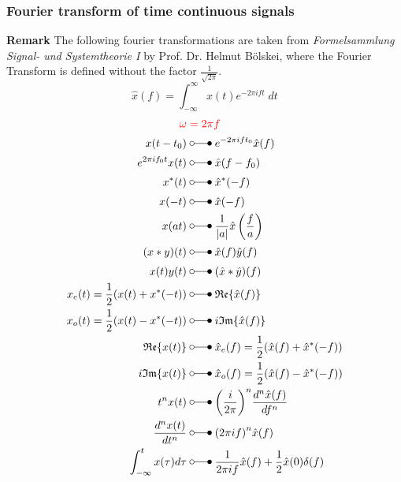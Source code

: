 \subsubsection{Fourier transform of time continuous signals}
{\footnotesize \textbf{Remark} The following fourier transformations are taken from \textit{Formelsammlung Signal- und Systemtheorie I} by Prof. Dr. Helmut Bölskei, 
where the Fourier Transform is defined without the factor $\frac{1}{\sqrt{2\pi}}$.}
\begin{equation*}
    \widehat{x}(f) =\int_{-\infty}^{\infty} x(t) e^{-2\pi ift}\; dt
\end{equation*}
\begin{align*}
    {\color{red} \omega}\;                   & {\color{red} =2\pi f}                                                    \\
    x(t-t_{0})  \;                           & \laplace\;    e^{-2\pi ift_{0}}\hat{x}(f)                                \\
    e^{2\pi if_0t}x(t)  \;                   & \laplace\;    \hat{x}(f-f_0)                                             \\
    x^{*}(t)  \;                             & \laplace\;    \hat{x}^{*}(-f)                                            \\
    x(-t)  \;                                & \laplace\;    \hat{x}(-f)                                                \\
    x(at)  \;                                & \laplace\;    \frac{1}{|a|}\hat{x}\left(\frac fa\right)                  \\
    (x*y)(t)  \;                             & \laplace\;    \hat{x}(f)\hat{y}(f)                                       \\
    x(t)y(t) \;                              & \laplace\;    (\hat{x}*\hat{y})(f)                                       \\
    x_{e}(t)=\frac{1}{2}(x(t)+x^{*}(-t))  \; & \laplace\;    \mathfrak{Re}\{\hat{x}(f)\}                                \\
    x_o(t)=\frac{1}{2}(x(t)-x^*(-t)) \;      & \laplace\;    i\mathfrak{Im}\{\hat{x}(f)\}                               \\
    \mathfrak{Re}\{x(t)\}  \;                & \laplace\;    \hat{x}_{e}(f) =\frac{1}{2}(\hat{x}(f)+\hat{x}^{*}(-f))    \\
    i\mathfrak{Im}\{x(t)\}  \;               & \laplace\;    \hat{x}_{o}(f) =\frac12(\hat{x}(f)-\hat{x}^*(-f))          \\
    t^{n}x(t)  \;                            & \laplace\;    {\left(\frac i{2\pi}\right)}^n\frac{d^n\hat{x}(f)}{df^n}   \\
    \frac{d^n x(t)}{dt^n}  \;                & \laplace\;    {(2\pi if)}^n\hat{x}(f)                                    \\
    \int_{-\infty}^t x(\tau)d\tau \;         & \laplace\;    \frac{1}{2\pi if}\hat{x}(f)+\frac{1}{2}\hat{x}(0)\delta(f) \\
\end{align*}

